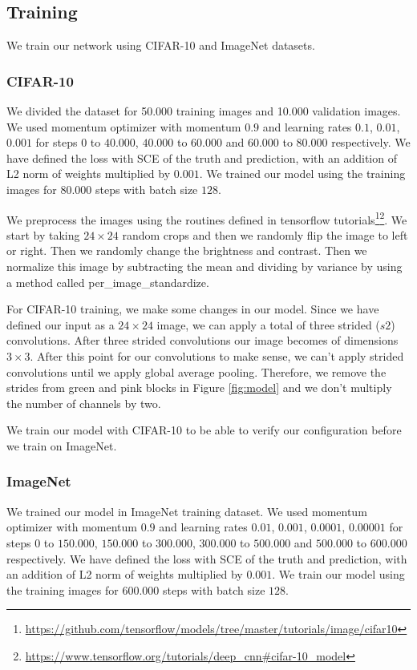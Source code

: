 \subsection{Training}
We train our network using CIFAR-10 and ImageNet datasets. 

\subsubsection{CIFAR-10}
We divided the dataset for 50.000 training images and 10.000 validation images. We used momentum optimizer with momentum $0.9$ and learning rates $0.1$, $0.01$, $0.001$ for steps $0$ to $40.000$, $40.000$ to $60.000$ and $60.000$ to $80.000$ respectively. We have defined the loss with SCE of the truth and prediction, with an addition of L2 norm of weights multiplied by $0.001$. We trained our model using the training images for $80.000$ steps with batch size $128$. 

We preprocess the images using the routines defined in tensorflow tutorials\footnote{\url{https://github.com/tensorflow/models/tree/master/tutorials/image/cifar10}}\footnote{\url{https://www.tensorflow.org/tutorials/deep\_cnn\#cifar-10\_model}}. We start by taking $24 \times 24$ random crops and then we randomly flip the image to left or right. Then we randomly change the brightness and contrast. Then we normalize this image by subtracting the mean and dividing by variance by using a method called per\_image\_standardize.

For CIFAR-10 training, we make some changes in our model. Since we have defined our input as a $24 \times 24$ image, we can apply a total of three strided ($s2$) convolutions. After three strided convolutions our image becomes of dimensions $3 \times 3$. After this point for our convolutions to make sense, we can't apply strided convolutions until we apply global average pooling. Therefore, we remove the strides from green and pink blocks in Figure \ref{fig:model} and we don't multiply the number of channels by two. 

We train our model with CIFAR-10 to be able to verify our configuration before we train on ImageNet. 

\subsubsection{ImageNet}
We trained our model in ImageNet training dataset. We used momentum optimizer with momentum $0.9$ and learning rates $0.01$, $0.001$, $0.0001$, $0.00001$ for steps $0$ to $150.000$, $150.000$ to $300.000$, $300.000$ to $500.000$ and $500.000$ to $600.000$ respectively. We have defined the loss with SCE of the truth and prediction, with an addition of L2 norm of weights multiplied by $0.001$. We train our model using the training images for $600.000$ steps with batch size $128$.

